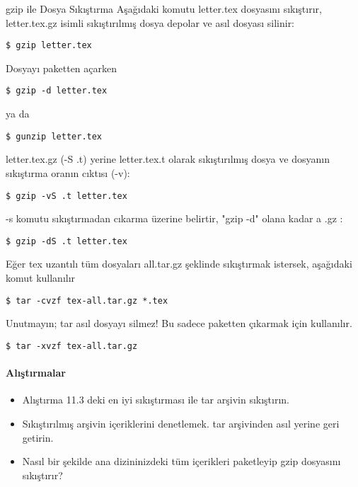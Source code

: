 \begin{section}{gzip ile Dosya Sıkıştırma}
Aşağıdaki komutu letter.tex dosyasını sıkıştırır, letter.tex.gz isimli sıkıştırılmış dosya depolar ve asıl dosyası silinir:
\begin{verbatim}
$ gzip letter.tex
\end{verbatim}
Dosyayı paketten açarken
\begin{verbatim}
$ gzip -d letter.tex
\end{verbatim}
ya da
\begin{verbatim}
$ gunzip letter.tex
\end{verbatim}
letter.tex.gz (-S .t) yerine letter.tex.t olarak sıkıştırılmış dosya ve dosyanın sıkıştırma oranın cıktısı (-v):
\begin{verbatim}
$ gzip -vS .t letter.tex
\end{verbatim}
-s komutu sıkıştırmadan cıkarma üzerine belirtir, "gzip -d" olana kadar a .gz :
\begin{verbatim}
$ gzip -dS .t letter.tex
\end{verbatim}
Eğer tex uzantılı tüm dosyaları all.tar.gz şeklinde sıkıştırmak istersek, aşağıdaki komut kullanılır
\begin{verbatim}
$ tar -cvzf tex-all.tar.gz *.tex
\end{verbatim}
Unutmayın; tar asıl dosyayı silmez! Bu sadece paketten çıkarmak için kullanılır.
\begin{verbatim}
$ tar -xvzf tex-all.tar.gz
\end{verbatim}
\paragraph{Alıştırmalar}{
\begin{itemize}
 \item Alıştırma 11.3 deki en iyi sıkıştırması ile tar arşivin sıkıştırın.
 \item Sıkıştırılmış arşivin içeriklerini denetlemek. tar arşivinden asıl yerine geri getirin.
 \item Nasıl bir şekilde ana dizininizdeki tüm içerikleri paketleyip gzip dosyasını sıkıştırır?
\end{itemize}}
\end{section}
